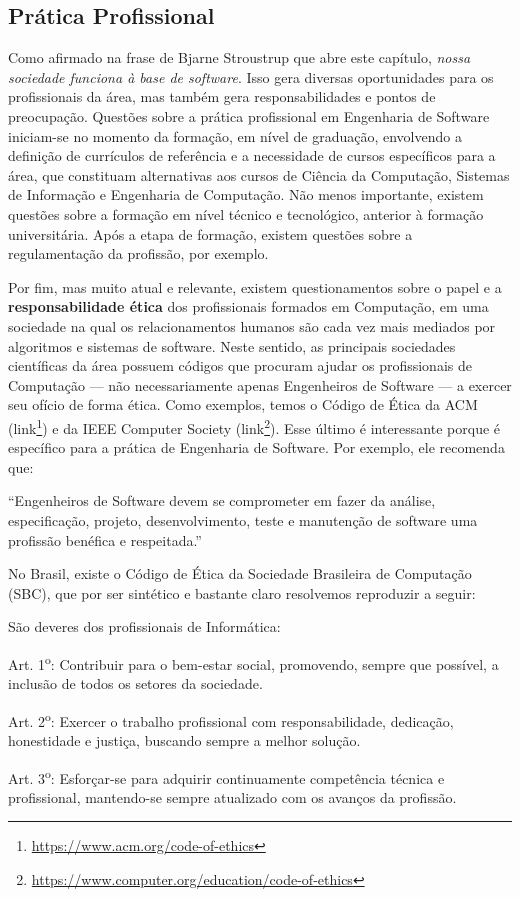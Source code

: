 \documentclass[
  11pt,
  twoside]{book}
\DeclareRobustCommand{\href}[2]{#2\footnote{\url{#1}}}
\renewenvironment{quote}{\centering \vspace{1.5ex} \begin{tcolorbox}[colback=backcolor, width=4.9in]}{\end{tcolorbox}}
\begin{document}
\hypertarget{pruxe1tica-profissional}{%
\subsection{Prática Profissional}\label{pruxe1tica-profissional}}

 Como afirmado na frase de Bjarne Stroustrup
que abre este capítulo, \emph{nossa sociedade funciona à base de
software}. Isso gera diversas oportunidades para os profissionais da
área, mas também gera responsabilidades e pontos de preocupação.
Questões sobre a prática profissional em Engenharia de Software
iniciam-se no momento da formação, em nível de graduação, envolvendo a
definição de currículos de referência e a necessidade de cursos
específicos para a área, que constituam alternativas aos cursos de
Ciência da Computação, Sistemas de Informação e Engenharia de
Computação. Não menos importante, existem questões sobre a formação em
nível técnico e tecnológico, anterior à formação universitária. Após a
etapa de formação, existem questões sobre a regulamentação da profissão,
por exemplo.

 Por fim, mas muito atual e relevante, existem
questionamentos sobre o papel e a \textbf{responsabilidade ética} dos
profissionais formados em Computação, em uma sociedade na qual os
relacionamentos humanos são cada vez mais mediados por algoritmos e
sistemas de software. Neste sentido, as principais sociedades
científicas da área possuem códigos que procuram ajudar os profissionais
de Computação --- não necessariamente apenas Engenheiros de Software ---
a exercer seu ofício de forma ética. Como exemplos, temos o Código de
Ética da ACM (\href{https://www.acm.org/code-of-ethics}{link}) e da IEEE
Computer Society
(\href{https://www.computer.org/education/code-of-ethics}{link}). Esse
último é interessante porque é específico para a prática de Engenharia
de Software. Por exemplo, ele recomenda que:

\begin{quote}
``Engenheiros de Software devem se comprometer em fazer da análise,
especificação, projeto, desenvolvimento, teste e manutenção de software
uma profissão benéfica e respeitada.''
\end{quote}

 No Brasil, existe o Código de Ética da Sociedade
Brasileira de Computação (SBC), que por ser sintético e bastante claro
resolvemos reproduzir a seguir:

\begin{quote}
São deveres dos profissionais de Informática:

Art. 1\textsuperscript{o}: Contribuir para o bem-estar social,
promovendo, sempre que possível, a inclusão de todos os setores da
sociedade.

Art. 2\textsuperscript{o}: Exercer o trabalho profissional com
responsabilidade, dedicação, honestidade e justiça, buscando sempre a
melhor solução.

Art. 3\textsuperscript{o}: Esforçar-se para adquirir continuamente
competência técnica e profissional, mantendo-se sempre atualizado com os
avanços da profissão.
\end{quote}
\end{document}
